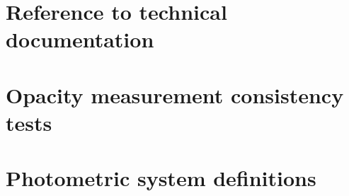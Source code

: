 \documentclass[a4paper, 11pt]{article} %
\begin{document}
  \section{Reference to technical documentation}
  \label{ap:doc}
  

  \section{Opacity measurement consistency tests}
  \label{ap:opacity}
  

  \section{Photometric system definitions}
  
  \label{ap:cal_HA}

  
  

  

\clearpage

%



\end{document}
